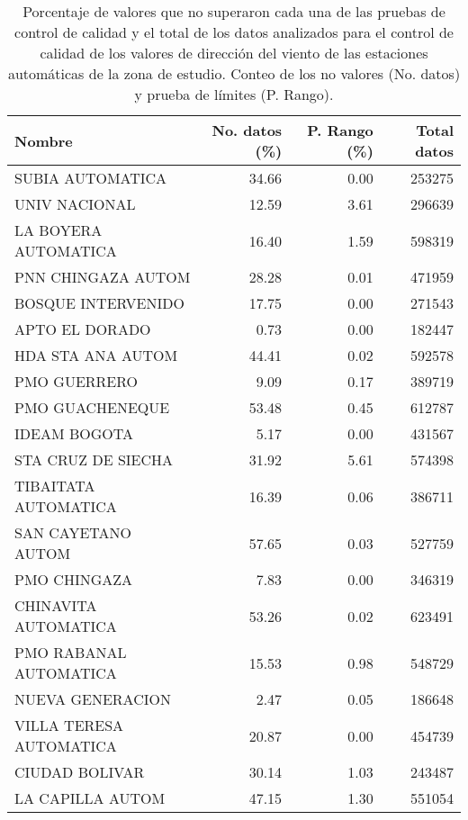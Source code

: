\begin{table}[H]
\begin{center}

\caption{Porcentaje de valores que no superaron cada una de las pruebas de control de calidad y el total de los datos analizados para el control de calidad de los valores de dirección del viento de las estaciones automáticas de la zona de estudio. Conteo de los no valores (No. datos) y prueba de límites (P. Rango).}

\begin{tabular}{lrrr}
\toprule
      Nombre &  No. datos  (\%)&  P. Rango  (\%)& Total datos \\
\midrule
         SUBIA AUTOMATICA &      34.66 &      0.00 &        253275 \\
           UNIV NACIONAL &      12.59 &      3.61 &        296639 \\
    LA BOYERA AUTOMATICA &      16.40 &      1.59 &        598319 \\
      PNN CHINGAZA AUTOM &      28.28 &      0.01 &        471959 \\
      BOSQUE INTERVENIDO &      17.75 &      0.00 &        271543 \\
          APTO EL DORADO &       0.73 &      0.00 &        182447 \\
       HDA STA ANA AUTOM &      44.41 &      0.02 &        592578 \\
            PMO GUERRERO &       9.09 &      0.17 &        389719 \\
         PMO GUACHENEQUE &      53.48 &      0.45 &        612787 \\
            IDEAM BOGOTA &       5.17 &      0.00 &        431567 \\
      STA CRUZ DE SIECHA &      31.92 &      5.61 &        574398 \\
    TIBAITATA AUTOMATICA &      16.39 &      0.06 &        386711 \\
      SAN CAYETANO AUTOM &      57.65 &      0.03 &        527759 \\
            PMO CHINGAZA &       7.83 &      0.00 &        346319 \\
    CHINAVITA AUTOMATICA &      53.26 &      0.02 &        623491 \\
  PMO RABANAL AUTOMATICA &      15.53 &      0.98 &        548729 \\
        NUEVA GENERACION &       2.47 &      0.05 &        186648 \\
 VILLA TERESA AUTOMATICA &      20.87 &      0.00 &        454739 \\
          CIUDAD BOLIVAR &      30.14 &      1.03 &        243487 \\
        LA CAPILLA AUTOM &      47.15 &      1.30 &        551054 \\
\bottomrule
\end{tabular}
		\label{tabla:val_vel_viento}
\end{center}
\end{table}

